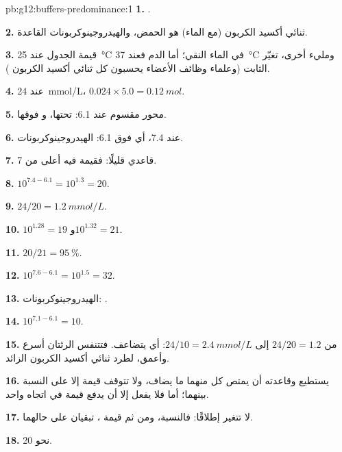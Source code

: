 \begin{solution}{pb:g12:buffers-predominance:1}
\textbf{1.} .

\textbf{2.} ثنائي أكسيد الكربون  (مع الماء) هو الحمض،
والهيدروجينوكربونات القاعدة.

\textbf{3.} قيمة الجدول عند \qty{25}{\celsius} في الماء النقي؛ أما
الدم فعند \qty{37}{\celsius} ومليء  أخرى، تغيّر
الثابت (وعلماء وظائف الأعضاء يحسبون كل ثنائي أكسيد الكربون ).

\textbf{4.} عند \qty{24}{mmol/L}، $0.024 \times 5.0 = \qty{0.12}{mol}$.

\textbf{5.} محور  مقسوم عند 6.1:  تحتها، و فوقها.

\textbf{6.} عند 7.4، أي فوق 6.1: الهيدروجينوكربونات.

\textbf{7.} قاعدي قليلًا: فقيمة  فيه أعلى من 7.

\textbf{8.} $10^{7.4 - 6.1} = 10^{1.3} = 20$.

\textbf{9.} $24 / 20 = \qty{1.2}{mmol/L}$.

\textbf{10.} $10^{1.28} = 19$ و$10^{1.32} = 21$.

\textbf{11.} $20/21 = \qty{95}{\percent}$.

\textbf{12.} $10^{7.6 - 6.1} = 10^{1.5} = 32$.

\textbf{13.}  الهيدروجينوكربونات:
.

\textbf{14.} $10^{7.1 - 6.1} = 10$.

\textbf{15.} من $24/20 = 1.2$ إلى $24/10 = \qty{2.4}{mmol/L}$: أي يتضاعف.
فتتنفس الرئتان أسرع وأعمق، لطرد ثنائي أكسيد الكربون
الزائد.

\textbf{16.} يستطيع  وقاعدته أن يمتص كل منهما ما يضاف،
ولا تتوقف قيمة  إلا على النسبة بينهما؛ أما  فلا يفعل إلا أن يدفع
قيمة  في اتجاه واحد.

\textbf{17.} لا تتغير إطلاقًا: فالنسبة، ومن ثم قيمة ، تبقيان على حالهما.

\textbf{18.} نحو 20.
\end{solution}
